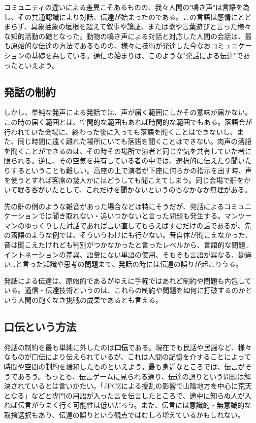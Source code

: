 コミュニティの違いによる差異こそあるものの、我々人間の"鳴き声"は言語を為し、その共通認識により対話、伝達が始まったのである。この言語は感情にとどまらず、具象抽象の垣根を超えて叙事や論証、または歌や言葉遊びと言った様々な知的活動の礎となった。動物の鳴き声による対話と対応した人間の会話は、最も原始的な伝達の方法であるものの、様々に技術が発達した今なおコミュニケーションの基礎を為している。通信の始まりは、このような"発話による伝達"であったといえよう。

\subsection{発話の制約}
しかし、単純な発声による発話では、声が届く範囲にしかその意味が届かない。この時の届く範囲とは、空間的な範囲もあれば時間的な範囲でもある。落語会が行われていた会場に、終わった後に入っても落語を聞くことはできないし、また、同じ時間に遠く離れた場所にいても落語を聞くことはできない。肉声の落語を聞くことができるのは、その時その場所で演者と同じ空気を共有していた者に限られる。逆に、その空気を共有している者の中では、選択的に伝えたり聞いたりするということも難しい。高座の上で演者が下座に何らかの指示を出す時、声を使うとすれば客席の幾人かにはどうしても聞こえてしまう。同じ会場で鼾をかいて眠る客がいたとして、これだけを聞かないというのもなかなか無理がある。

先の鼾の例のような雑音があった場合などは特にそうだが、発話によるコミュニケーションでは聞き取れない・追いつかないと言った問題も発生する。マンツーマンのゆっくりした対話であれば言い直してもらえばすむだけの話であるが、先の落語のような例では、そういうわけにも行かない。音自体が聞こえなかった、音は聞こえたけれども判別がつかなかったと言ったレベルから、言語的な問題…イントネーションの差異、語彙にない単語の使用、そもそも言語が異なる、勘違い…と言った知識や思考の問題まで、発話の時には伝達の誤りが起こりうる。

発話による伝達は、原始的であるがゆえに手軽ではあれど制約や問題も内包している。通信・伝達技術というのは、これらの制約や問題を如何に打破するのかという人間の飽くなき挑戦の成果であるとも言える。

\subsection{口伝という方法}
発話の制約を最も単純に外したのは\textbf{口伝}である。現在でも民話や民謡など、様々なものが口伝により伝えられているが、これは人間の記憶を介することによって時間や空間の制約を緩和したものといえよう。最も身近なところでは、伝言がそうであろう。もっとも、伝言ゲームに見られる通り、伝達の誤りという問題は解決されているとは言いがたい。「JPCZによる擾乱の影響で山陰地方を中心に荒天となる」などと専門の用語が入った言を伝言したところで、途中に知らぬ人が入れば伝言がうまく行く可能性は低いだろう。また、伝言には意識的・無意識的な取捨選択もあり、伝達の誤りという観点ではむしろ増えているかもしれない。

